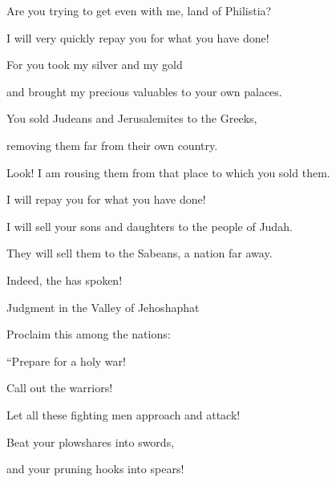 {\par }{\Q Are
you
trying
to get
even
with me, land
of Philistia?

\par }{\Q I will very quickly
repay
you
for what you
have done!
\par }{\Q {}For you took
my silver
and my gold
\par }{\Q and brought
my precious
valuables
to your own palaces.
\par }{\Q {}You sold
Judeans
and Jerusalemites
to the Greeks,
\par }{\Q removing
them far
from their own country.
\par }{\Q {}Look! I am rousing
them from
that place
to which
you sold
them.
\par }{\Q I will repay you for what you have done!
\par }{\Q {}I will sell
your sons
and daughters
to the people of Judah.
\par }{\Q They will sell
them to the Sabeans,
a nation
far
away.
\par }{\Q Indeed,
the {}
has spoken!
\par }{\SH Judgment in the Valley of Jehoshaphat
\par }{\Q {}Proclaim
this
among the nations:
\par }{\Q “Prepare
for a holy war!
\par }{\Q Call
out the warriors!
\par }{\Q Let all
these fighting
men
approach
and attack!
\par }{\Q {}Beat
your plowshares
into swords,
\par }{\Q and your pruning hooks
into spears!

}
